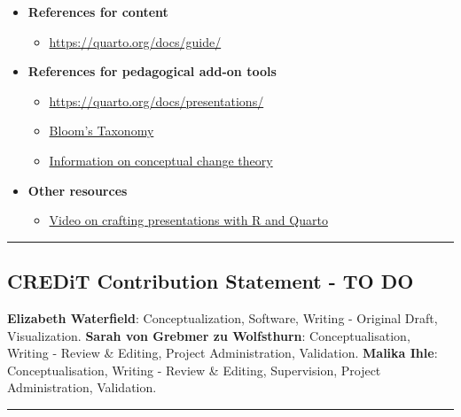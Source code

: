 \documentclass[
  letterpaper,
  DIV=11,
  numbers=noendperiod]{scrartcl}
\providecommand{\tightlist}{%
  \setlength{\itemsep}{0pt}\setlength{\parskip}{0pt}}
\begin{document}
\begin{itemize}
\tightlist
\item
  \textbf{References for content}

  \begin{itemize}
  \tightlist
  \item
    \url{https://quarto.org/docs/guide/}
  \end{itemize}
\item
  \textbf{References for pedagogical add-on tools}

  \begin{itemize}
  \tightlist
  \item
    \url{https://quarto.org/docs/presentations/}
  \item
    \href{https://health.ucdavis.edu/mdprogram/curriculum/pdfs/blooms-taxonomy-vanderbilt.pdf}{Bloom's
    Taxonomy}
  \item
    \href{https://www.researchgate.net/publication/255659929_Conceptual_change_A_powerful_framework_for_improving_science_teaching_and_learning}{Information
    on conceptual change theory}
  \end{itemize}
\item
  \textbf{Other resources}

  \begin{itemize}
  \tightlist
  \item
    \href{https://www.youtube.com/watch?v=01KifhHDkFk}{Video on crafting
    presentations with R and Quarto}
  \end{itemize}
\end{itemize}

\begin{center}\rule{0.5\linewidth}{0.5pt}\end{center}

\subsection{CREDiT Contribution Statement - TO
DO}\label{credit-contribution-statement---to-do}

\textbf{Elizabeth Waterfield}: Conceptualization, Software, Writing -
Original Draft, Visualization. \textbf{Sarah von Grebmer zu Wolfsthurn}:
Conceptualisation, Writing - Review \& Editing, Project Administration,
Validation. \textbf{Malika Ihle}: Conceptualisation, Writing - Review \&
Editing, Supervision, Project Administration, Validation.

\begin{center}\rule{0.5\linewidth}{0.5pt}\end{center}
\end{document}
